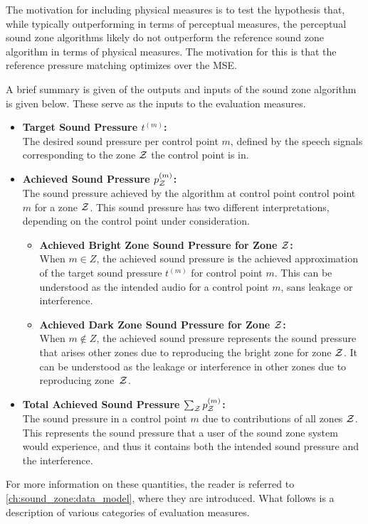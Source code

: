 The motivation for including physical measures is to test the hypothesis that, 
while typically outperforming in terms of perceptual measures, the perceptual sound zone algorithms likely do not 
outperform the reference sound zone algorithm in terms of physical measures.
The motivation for this is that the reference pressure matching optimizes over the MSE.

A brief summary is given of the outputs and inputs of the sound zone algorithm is given below.
These serve as the inputs to the evaluation measures.
\begin{itemize}
    \item \textbf{Target Sound Pressure $t^{(m)}$:}\\
        The desired sound pressure per control point $m$, defined by the speech signals 
        corresponding to the zone $\mathcal{Z}$ the control point is in.
    \item \textbf{Achieved Sound Pressure $p_{\mathcal{Z}}^{(m)}$:}\\
        The sound pressure achieved by the algorithm at control point control point $m$ for a zone $\mathcal{Z}$.
        This sound pressure has two different interpretations, depending on the control point under consideration.
        \begin{itemize}
            \item \textbf{Achieved Bright Zone Sound Pressure for Zone $\mathcal{Z}$:}\\
                When $m \in Z$, the achieved sound pressure is the achieved approximation of the 
                target sound pressure $t^{(m)}$ for control point $m$.
                This can be understood as the intended audio for a control point $m$, sans leakage or interference. 
            \item \textbf{Achieved Dark Zone Sound Pressure for Zone $\mathcal{Z}$:}\\
                When $m \notin Z$, the achieved sound pressure represents the sound pressure 
                that arises other zones due to reproducing the bright zone for zone $\mathcal{Z}$. 
                It can be understood as the leakage or interference in other zones due to reproducing zone~$\mathcal{Z}$.
        \end{itemize}
    \item \textbf{Total Achieved Sound Pressure $\sum_{\mathcal{Z}} p_{\mathcal{Z}}^{(m)}$:}\\
        The sound pressure in a control point $m$ due to contributions of all zones $\mathcal{Z}$.
        This represents the sound pressure that a user of the sound zone system would experience,
        and thus it contains both the intended sound pressure and the interference.
\end{itemize}
For more information on these quantities, the reader is referred to \autoref{ch:sound_zone:data_model}, where they 
are introduced.
What follows is a description of various categories of evaluation measures.


